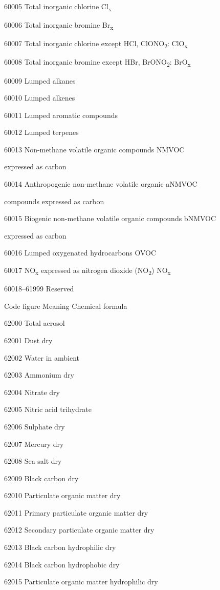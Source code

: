 60005 Total inorganic chlorine Cl\textsubscript{x}

60006 Total inorganic bromine Br\textsubscript{x}

60007 Total inorganic chlorine except HCl, ClONO\textsubscript{2}: ClO\textsubscript{x}

60008 Total inorganic bromine except HBr, BrONO\textsubscript{2}: BrO\textsubscript{x}

60009 Lumped alkanes

60010 Lumped alkenes

60011 Lumped aromatic compounds

60012 Lumped terpenes

60013 Non-methane volatile organic compounds NMVOC

expressed as carbon

60014 Anthropogenic non-methane volatile organic aNMVOC

compounds expressed as carbon

60015 Biogenic non-methane volatile organic compounds bNMVOC

expressed as carbon

60016 Lumped oxygenated hydrocarbons OVOC

60017 NO\textsubscript{x} expressed as nitrogen dioxide (NO\textsubscript{2}) NO\textsubscript{x}

60018--61999 Reserved

Code figure Meaning Chemical formula

62000 Total aerosol

62001 Dust dry

62002 Water in ambient

62003 Ammonium dry

62004 Nitrate dry

62005 Nitric acid trihydrate

62006 Sulphate dry

62007 Mercury dry

62008 Sea salt dry

62009 Black carbon dry

62010 Particulate organic matter dry

62011 Primary particulate organic matter dry

62012 Secondary particulate organic matter dry

62013 Black carbon hydrophilic dry

62014 Black carbon hydrophobic dry

62015 Particulate organic matter hydrophilic dry

